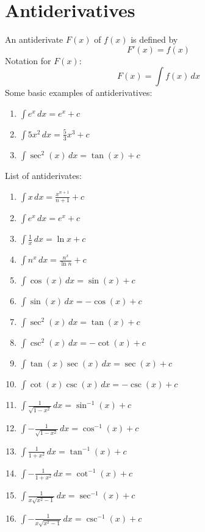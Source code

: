 \documentclass{article}
\begin{document}
\section{Antiderivatives}
An antiderivate $F(x)$ of $f(x)$ is defined by
\[F'(x) = f(x)\]
Notation for $F(x)$:
\[F(x) = \int f(x) \,dx\]
Some basic examples of antiderivatives:

\begin{multicols}{2}
    \begin{enumerate}
        \item $\int e^x \,dx = e^x+c$
        \item $\int 5x^2 \,dx = \frac{5}{3}x^3+c$
        \item $\int \sec^2(x) \,dx = \tan(x)+c$
    \end{enumerate}
\end{multicols}
List of antiderivates:
\begin{multicols}{2}
    \begin{enumerate}
        \item $\int x \,dx = \frac{x^{n+1}}{n+1} + c $
        \item $\int e^x \,dx = e^x +c$
        \item $\int \frac{1}{x} \,dx = \ln x+c$
        \item $\int n^x \,dx = \frac{n^x}{\ln n} +c$
        \item $\int \cos(x) \,dx = \sin(x) +c$
        \item $\int \sin(x) \,dx = -\cos(x) +c$
        \item $\int \sec^2(x) \,dx = \tan(x) +c$
        \item $\int \csc^2(x) \,dx = -\cot(x) +c$
        \item $\int \tan(x)\sec(x) \,dx = \sec(x) +c$
        \item $\int \cot(x)\csc(x) \,dx = -\csc(x) +c$
        \item $\int \frac{1}{\sqrt{1-x^2}} \,dx = \sin^{-1}(x) +c$
        \item $\int -\frac{1}{\sqrt{1-x^2}} \,dx = \cos^{-1}(x) +c$
        \item $\int \frac{1}{1+x^2} \,dx = \tan^{-1}(x) +c$
        \item $\int -\frac{1}{1+x^2} \,dx = \cot^{-1}(x) +c$
        \item $\int \frac{1}{x\sqrt{x^2-1}} \,dx = \sec^{-1}(x) +c$
        \item $\int -\frac{1}{x\sqrt{x^2-1}} \,dx = \csc^{-1}(x) +c$
    \end{enumerate}
\end{multicols}   
\end{document}
